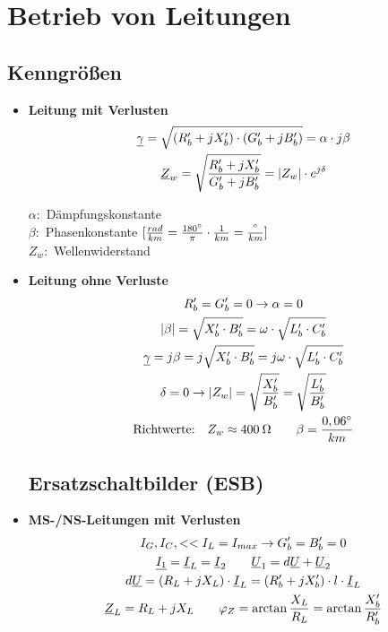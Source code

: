 \newpage
\section{Betrieb von Leitungen}
\subsection{Kenngrößen}

\begin{itemize}
    \item[] \textbf{Leitung mit Verlusten}
    \begin{gather*}
        \underline{\gamma} = \sqrt{(R'_b +jX'_b)\cdot(G'_b+jB'_b)}= \alpha \cdot j \beta\\
        \underline{Z}_w = \sqrt{\dfrac{R'_b + jX'_b}{G'_b + jB'_b}}= |Z_w| \cdot e^{j\delta}
    \end{gather*}

    \indent $\alpha:$ Dämpfungskonstante\\
    \indent $\beta:$ Phasenkonstante $[\frac{rad}{km} = \frac{180\degree}{\pi} \cdot \frac{1}{km} = \frac{\degree}{km}]$\\
    \indent $Z_w:$ Wellenwiderstand

    \item[] \textbf{Leitung ohne Verluste}
        \begin{gather*}
            R'_b = G'_b = 0\rightarrow \alpha = 0\\
            |\beta| = \sqrt{X'_b \cdot B'_b} = \omega \cdot \sqrt{L'_b \cdot C'_b}\\
            \underline{\gamma} = j \beta = j \sqrt{X'_b \cdot B'_b} = j \omega \cdot \sqrt{L'_b \cdot C'_b}\\
            \delta = 0 \rightarrow |Z_w| = \sqrt{ \dfrac{X'_b}{B'_b} } = \sqrt{ \dfrac{L'_b}{B'_b} }\\
            \text{Richtwerte:} \quad
            Z_w \approx 400\: \ohm \qquad
            \beta = \frac{0,06\degree}{km}
        \end{gather*}

\subsection{Ersatzschaltbilder (ESB)}

\item[] \textbf{MS-/NS-Leitungen mit Verlusten}
        \begin{gather*}
            I_G, I_C, << I_L = I_{max} \rightarrow G'_b = B'_b = 0\\
            \underline{I_1} = \underline{I}_L = \underline{I}_2 \qquad
            \underline{U}_1 = d \underline{U} + \underline{U}_2\\
            d \underline{U} = (R_L + jX_L) \cdot \underline{I}_L = (R'_b +jX'_b) \cdot l \cdot \underline{I}_L\\
            \underline{Z}_L = R_L +jX_L \qquad \varphi_Z =\arctan \frac{X_L}{R_L} = \arctan \frac{X'_b}{R'_b}
        \end{gather*}


\end{itemize}
